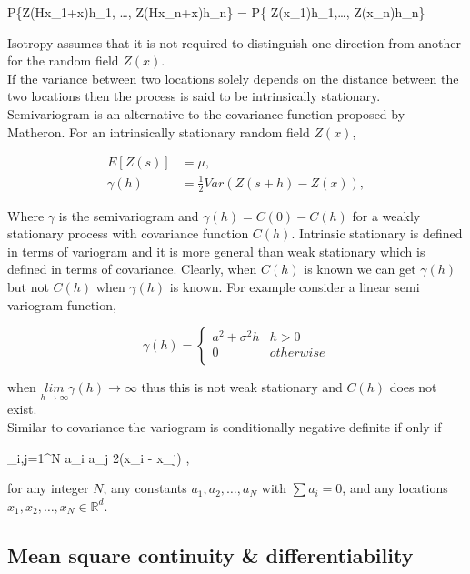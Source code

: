 \beq
P\{Z(Hx_1+x)\le h_1, \ldots, Z(Hx_n+x)\le h_n\} = P\{ Z(x_1)\le h_1,\ldots, Z(x_n)\le h_n\}
\eeq

Isotropy assumes that it is not required to distinguish one direction from another for the random field $Z(x)$.\\


If the variance between two locations solely depends on the distance between the two locations then the process is said to be intrinsically stationary. Semivariogram is an alternative to the covariance function proposed by Matheron. For an intrinsically stationary random field $Z(x)$,

\begin{align}
	E[Z(s)]   & = \mu , \nonumber                \\
	\gamma(h) & = \frac{1}{2} Var(Z(s+h) -Z(x)), 
\end{align}

Where $\gamma$ is the semivariogram and $\gamma(h) = C(0) - C(h)$ for a weakly stationary process with covariance function $C(h)$. Intrinsic stationary is defined in terms of variogram and it is more general than weak stationary which is defined in terms of covariance. Clearly, when $C(h)$ is known we can get $\gamma(h)$ but not $C(h)$ when $\gamma(h)$ is known. For example consider a linear semi variogram function,

\[
	\gamma(h) = \left \{ \begin{array}{cc}
	a^2+\sigma^2h & h>0 \\
	0 & otherwise \\
	\end{array}
	\right.
\]

when $\underset{h \to \infty} {lim} \gamma(h) \to \infty$ thus this is not weak stationary and $C(h)$ does not exist. \\


Similar to covariance the variogram is conditionally negative definite if only if

\beq
\sum_{i,j=1}^{N} a_i a_j 2\gamma(x_i - x_j) ,
\eeq

for any integer $N$, any constants $a_1, a_2, \ldots, a_N$ with $\sum a_i = 0$, and any locations $x_1, x_2, \ldots, x_N \in \mathbb{R}^d$.


\subsection{Mean square continuity \& differentiability}

